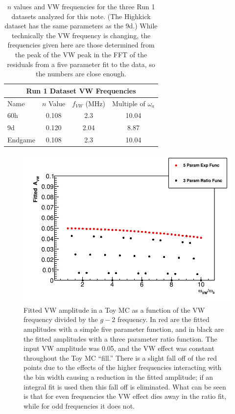 \documentclass[12pt,letterpaper]{article}
\def\gmtwo{$g-2$\xspace}
\def\wa{$\omega_{a}$\xspace}
\begin{document}
\begin{table}[]
\centering
\setlength\tabcolsep{10pt}
\renewcommand{\arraystretch}{1.2}
\begin{tabular*}{.8\linewidth}{@{\extracolsep{\fill}}lccc}
  \hline
    \multicolumn{4}{c}{\textbf{Run 1 Dataset VW Frequencies}} \\
  \hline\hline
    Name & $n$ Value & $f_{VW}$ (MHz) & Multiple of \wa \\
  \hline
    60h &  0.108 & 2.3 & 10.04\\
    9d & 0.120 & 2.04 & 8.87 \\
    Endgame & 0.108 & 2.3 & 10.04 \\
  \hline
\end{tabular*}
\caption[Run 1 datasets]{$n$ values and VW frequencies for the three Run 1 datasets analyzed for this note. (The Highkick dataset has the same parameters as the 9d.) While technically the VW frequency is changing, the frequencies given here are those determined from the peak of the VW peak in the FFT of the residuals from a five parameter fit to the data, so the numbers are close enough.}
\label{tab:Run1Datasets}
\end{table}


\begin{figure}[]
    \centering
    \includegraphics[width=.8\textwidth]{Fitted_Avw_Vs_Wvw_1x-10x}
    \caption[]{Fitted VW amplitude in a Toy MC as a function of the VW frequency divided by the \gmtwo frequency. In red are the fitted amplitudes with a simple five parameter function, and in black are the fitted amplitudes with a three parameter ratio function. The input VW amplitude was 0.05, and the VW effect was constant throughout the Toy MC ``fill.'' There is a slight fall off of the red points due to the effects of the higher frequencies interacting with the bin width causing a reduction in the fitted amplitude; if an integral fit is used then this fall off is eliminated. What can be seen is that for even frequencies the VW effect dies away in the ratio fit, while for odd frequencies it does not.}
    \label{fig:VW1x-10x}
\end{figure}
\end{document}
